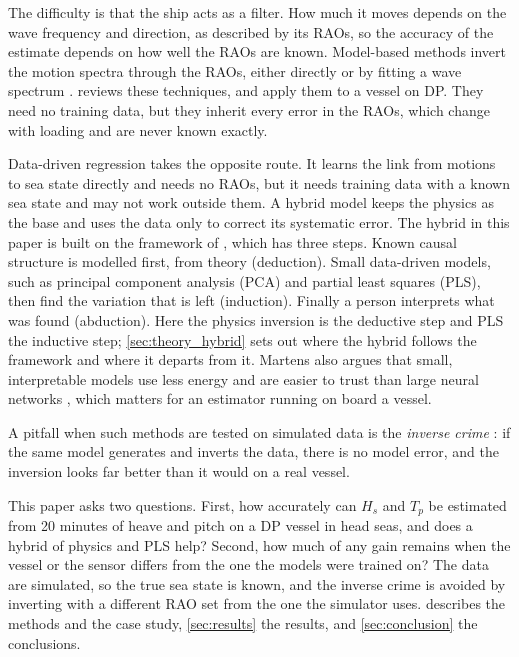 \documentclass[10pt,a4paper,twocolumn,twoside]{article}
\newcommand{\Hs}{H_{s}}
\newcommand{\Tp}{T_{p}}
\begin{document}
The difficulty is that the ship acts as a filter. How much it moves depends on the wave frequency
and direction, as described by its RAOs, so the accuracy of the estimate depends on how well the
RAOs are known. Model-based methods invert the motion spectra through the RAOs, either directly or
by fitting a wave spectrum \citep{tannuri2003}. \citet{nielsen2017} reviews these techniques, and
\citet{brodtkorb2018} apply them to a vessel on DP. They need no training data, but they inherit
every error in the RAOs, which change with loading and are never known exactly.

Data-driven regression takes the opposite route. It learns the link from motions to sea state
directly and needs no RAOs, but it needs training data with a known sea state and may not work
outside them. A hybrid model keeps the physics as the base and uses the data only to correct its
systematic error. The hybrid in this paper is built on the framework of \citet{martens2023}, which
has three steps. Known causal structure is modelled first, from theory (deduction). Small
data-driven models, such as principal component analysis (PCA) and partial least squares (PLS),
then find the variation that is left (induction). Finally a person interprets what was found
(abduction). Here the physics inversion is the deductive step and PLS the inductive step;
\cref{sec:theory_hybrid} sets out where the hybrid follows the framework and where it departs from
it. Martens also argues that small, interpretable models use less energy and are easier to trust
than large neural networks \citep{martens2025}, which matters for an estimator running on board a
vessel.

A pitfall when such methods are tested on simulated data is the \emph{inverse crime}
\citep{kaipio2005}: if the same model generates and inverts the data, there is no model error, and
the inversion looks far better than it would on a real vessel.

This paper asks two questions. First, how accurately can $\Hs$ and $\Tp$ be estimated from 20
minutes of heave and pitch on a DP vessel in head seas, and does a hybrid of physics and PLS help?
Second, how much of any gain remains when the vessel or the sensor differs from the one the models
were trained on? The data are simulated, so the true sea state is known, and the inverse crime is
avoided by inverting with a different RAO set from the one the simulator uses. 
describes the methods and the case study, \cref{sec:results} the results, and
\cref{sec:conclusion} the conclusions.
\end{document}
